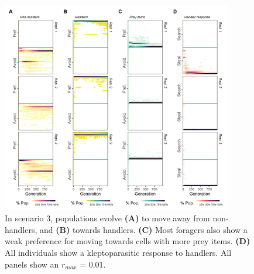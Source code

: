\documentclass[11pt]{article}
\begin{document}
\begin{figure}[h!]
        \centering
        \includegraphics*[width=0.9\textwidth]{figures/fig_wt_evo_facultative.png}
        \caption{In scenario 3, populations evolve \textbf{(A)} to move away from non-handlers, and \textbf{(B)} towards handlers.
        \textbf{(C)} Most foragers also show a weak preference for moving towards cells with more prey items.
        \textbf{(D)} All individuals show a kleptoparasitic response to handlers.
        All panels show an $r_{max}$ = 0.01.}
\end{figure}
\end{document}
